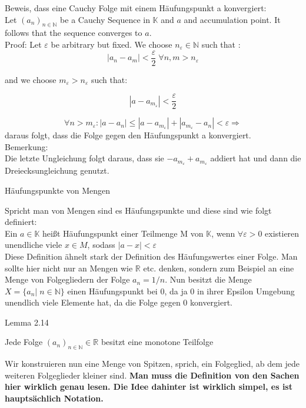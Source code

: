\documentclass[smallheadings,headsepline,12pt,a4paper]{scrartcl}
\begin{document}
\item Beweis, dass eine Cauchy Folge mit einem Häufungspunkt a konvergiert: \\

Let $(a_n)_{n\in \mathbb{N}}$ be a Cauchy Sequence in $\mathbb{K}$ and $a$ and accumulation point. It follows that the sequence converges to $a$. \\

Proof: Let $\varepsilon$ be arbitrary but fixed. We choose
$n_\varepsilon \in \mathbb{N} $ such that :
$$ |a_n- a_m| < \frac{\varepsilon}{2} \; \forall n,m > n_\varepsilon
$$ 
 
 and we choose $m_\varepsilon > n_\varepsilon $ such that:
 
 $$|a-a_{m_\varepsilon}| < \frac{\varepsilon}{2} $$
 
 $$ \forall n > m_\varepsilon : |a-a_n| \leq |a-a_{m_\varepsilon}| 
   + |a_{m_\varepsilon} - a_n| < \varepsilon \Rightarrow $$ daraus folgt, dass die Folge gegen den Häufungspunkt a konvergiert. \\
   
Bemerkung: \\ Die letzte Ungleichung folgt daraus, dass sie $-a_{m_\varepsilon} + a_{m_\varepsilon} $ addiert hat und dann die Dreiecksungleichung genutzt. 

\begin{center}
\item[Häufungspunkte von Mengen]
\end{center}
\item Spricht man von Mengen sind es Häufungspunkte und diese sind wie folgt definiert: \\

Ein $a\in \mathbb{K} $ heißt Häufungspunkt einer Teilmenge M von $\mathbb{K}$, wenn $\forall \varepsilon > 0 $ existieren unendliche viele $ x \in M $, sodass $|a-x| < \varepsilon $ \\

Diese Definition ähnelt stark der Definition des Häufungswertes einer Folge. Man sollte hier nicht nur an Mengen wie $\mathbb{R}$ etc. denken, sondern zum Beispiel an eine Menge von Folgegliedern der Folge $ a_n = 1/n $. Nun besitzt die Menge $ X = \{ a_n | \; n \in \mathbb{N} \} $ einen Häufungspunkt bei 0, da ja 0 in ihrer Epsilon Umgebung unendlich viele Elemente hat, da die Folge gegen 0 konvergiert.

\begin{center}
\item[Lemma 2.14]
\end{center}
\item Jede Folge $(a_n)_{n\in \mathbb{N}} \in \mathbb{R} $ besitzt eine monotone Teilfolge 
\item Wir konstruieren nun eine Menge von Spitzen, sprich, ein Folgeglied, ab dem jede weiteren Folgeglieder kleiner sind. \textbf{Man muss die Definition von den Sachen hier wirklich genau lesen. Die Idee dahinter ist wirklich simpel, es ist hauptsächlich Notation.}\\
\end{document}
